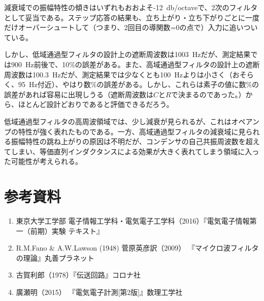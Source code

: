 \documentclass[10pt,a4j,dvipdfmx]{jsarticle}
\makeatletter
\let\@oldsec\section
\renewcommand{\section}[1]{\@oldsec{#1}\vspace{-5pt}{\color{TealBlue}\hrule height 0.6pt \hfill}\par}
\makeatother
\begin{document}
減衰域での振幅特性の傾きはいずれもおおよそ-\SI{12}{\decibel}/octaveで、2次のフィルタとして妥当である。ステップ応答の結果も、立ち上がり・立ち下がりごとに一度だけオーバーシュートして（つまり、2回目の導関数=0の点で）入力に追いついている。

しかし、低域通過型フィルタの設計上の遮断周波数は\SI{1003}{\hertz}だが、測定結果では\SI{900}{\hertz}前後で、10\%の誤差がある。また、高域通過型フィルタの設計上の遮断周波数は\SI{100.3}{\hertz}だが、測定結果では少なくとも\SI{100}{\hertz}よりは小さく（おそらく、\SI{95}{\hertz}付近）、やはり数\%の誤差がある。しかし、これらは素子の値に数\%の誤差があれば容易に出現しうる（遮断周波数は$C$と$R$で決まるのであった。）から、ほとんど設計どおりであると評価できるだろう。

低域通過型フィルタの高周波領域では、少し減衰が見られるが、これはオペアンプの特性が強く表れたものである。一方、高域通過型フィルタの減衰域に見られる振幅特性の跳ね上がりの原因は不明だが、コンデンサの自己共振周波数を超えてしまい、等価直列インダクタンスによる効果が大きく表れてしまう領域に入った可能性が考えられる。

\section{参考資料}
\begin{enumerate}
\item 東京大学工学部 電子情報工学科・電気電子工学科（2016）『電気電子情報第一（前期）実験 テキスト』
\item R.M.Fano \& A.W.Lawson (1948) 菅原英彦訳（2009） 『マイクロ波フィルタの理論』丸善プラネット
\item 古賀利郎（1978）『伝送回路』コロナ社
\item 廣瀬明（2015） 『電気電子計測[第2版]』数理工学社

\end{enumerate}
\end{document}

